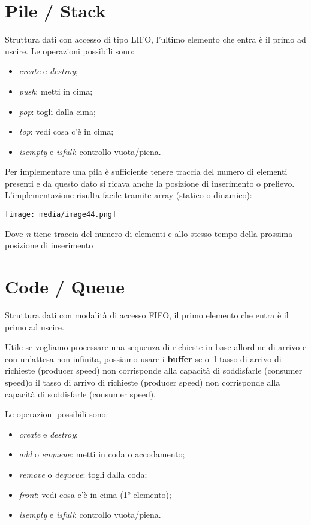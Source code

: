 \section{Pile / Stack}\label{pile-stack}

Struttura dati con accesso di tipo LIFO, l'ultimo elemento che entra è
il primo ad uscire. Le operazioni possibili sono:

\begin{itemize}
\item
  \emph{create} e \emph{destroy};
\item
  \emph{push}: metti in cima;
\item
  \emph{pop}: togli dalla cima;
\item
  \emph{top}: vedi cosa c'è in cima;
\item
  \emph{isempty} e \emph{isfull}: controllo vuota/piena.
\end{itemize}

Per implementare una pila è sufficiente tenere traccia del numero di
elementi presenti e da questo dato si ricava anche la posizione di
inserimento o prelievo. L'implementazione risulta facile tramite array
(statico o dinamico):

\texttt{[image: media/image44.png]}

Dove \emph{n} tiene traccia del numero di elementi e allo stesso tempo
della prossima posizione di inserimento

\section{Code / Queue}\label{code-queue}

Struttura dati con modalità di accesso FIFO, il primo elemento che entra
è il primo ad uscire.

Utile se vogliamo processare una sequenza di richieste in base
all\textquotesingle ordine di arrivo e con un'attesa non infinita,
possiamo usare i \textbf{buffer} se o il tasso di arrivo di richieste
(producer speed) non corrisponde alla capacità di soddisfarle (consumer
speed)o il tasso di arrivo di richieste (producer speed) non corrisponde
alla capacità di soddisfarle (consumer speed).

Le operazioni possibili sono:

\begin{itemize}
\item
  \emph{create} e \emph{destroy};
\item
  \emph{add} o \emph{enqueue}: metti in coda o accodamento;
\item
  \emph{remove} o \emph{dequeue}: togli dalla coda;
\item
  \emph{front}: vedi cosa c'è in cima (1° elemento);
\item
  \emph{isempty} e \emph{isfull}: controllo vuota/piena.
\end{itemize}

